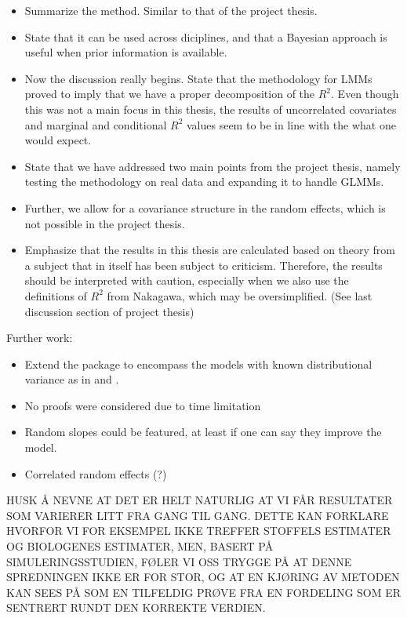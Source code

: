 \begin{itemize}
    \item Summarize the method. Similar to that of the project thesis. 
    \item State that it can be used across diciplines, and that a Bayesian approach is useful when prior information is available.
    \item Now the discussion really begins. State that the methodology for LMMs proved to imply that we have a proper decomposition of the $R^2$. Even though this was not a main focus in this thesis, the results of uncorrelated covariates and marginal and conditional $R^2$ values seem to be in line with the what one would expect. 
    \item State that we have addressed two main points from the project thesis, namely testing the methodology on real data and expanding it to handle GLMMs.
    \item Further, we allow for a covariance structure in the random effects, which is not possible in the project thesis.
    \item Emphasize that the results in this thesis are calculated based on theory from a subject that in itself has been subject to criticism. Therefore, the results should be interpreted with caution, especially when we also use the definitions of $R^2$ from Nakagawa, which may be oversimplified. (See last discussion section of project thesis)
\end{itemize}

Further work:
\begin{itemize}
    \item Extend the package to encompass the models with known distributional variance as in \citet{nakagawa2013general} and \citet{nakagawa2017}.
    \item No proofs were considered due to time limitation
    \item Random slopes could be featured, at least if one can say they improve the model.
    \item Correlated random effects (?)
\end{itemize}



HUSK Å NEVNE AT DET ER HELT NATURLIG AT VI FÅR RESULTATER SOM VARIERER LITT FRA GANG TIL GANG. DETTE KAN FORKLARE HVORFOR VI FOR EKSEMPEL IKKE TREFFER STOFFELS ESTIMATER OG BIOLOGENES ESTIMATER, MEN, BASERT PÅ SIMULERINGSSTUDIEN, FØLER VI OSS TRYGGE PÅ AT DENNE SPREDNINGEN IKKE ER FOR STOR, OG AT EN KJØRING AV METODEN KAN SEES PÅ SOM EN TILFELDIG PRØVE FRA EN FORDELING SOM ER SENTRERT RUNDT DEN KORREKTE VERDIEN.

